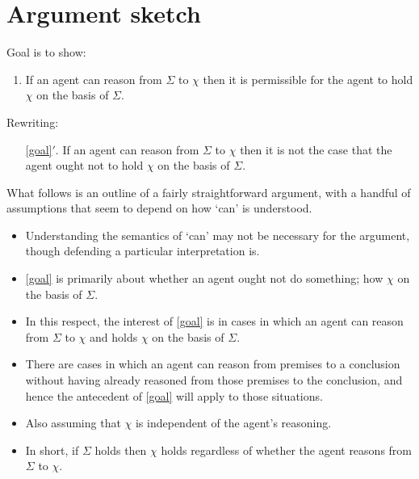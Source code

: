\documentclass[10pt]{article}
\begin{document}
\section{Argument sketch}
\label{sec:argument-sketch}

Goal is to show:
\begin{enumerate}[label=G\arabic*., ref=G\arabic*]
\item\label{goal} If an agent can reason from \(\Sigma\) to \(\chi\) then it is permissible for the agent to hold \(\chi\) on the basis of \(\Sigma\).
\end{enumerate}
Rewriting:
\begin{enumerate}
\item[\ref{goal}\('\).] If an agent can reason from \(\Sigma\) to \(\chi\) then it is not the case that the agent ought not to hold \(\chi\) on the basis of \(\Sigma\).
\end{enumerate}

What follows is an outline of a fairly straightforward argument, with a handful of assumptions that seem to depend on how `can' is understood.
\begin{itemize}
\item Understanding the semantics of `can' may not be necessary for the argument, though defending a particular interpretation is.
\end{itemize}

\begin{itemize}
\item \ref{goal} is primarily about whether an agent ought not do something; how \(\chi\) on the basis of \(\Sigma\).
\item In this respect, the interest of \ref{goal} is in cases in which an agent can reason from \(\Sigma\) to \(\chi\) and holds \(\chi\) on the basis of \(\Sigma\).
\item There are cases in which an agent can reason from premises to a conclusion without having already reasoned from those premises to the conclusion, and hence the antecedent of \ref{goal} will apply to those situations.
\end{itemize}

\begin{itemize}
\item Also assuming that \(\chi\) is independent of the agent's reasoning.
\item In short, if \(\Sigma\) holds then \(\chi\) holds regardless of whether the agent reasons from \(\Sigma\) to \(\chi\).
\end{itemize}
\end{document}

